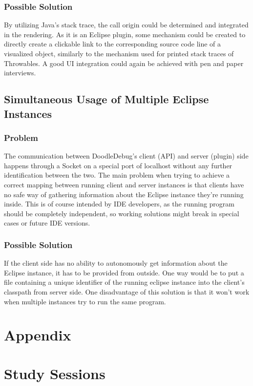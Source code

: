 \documentclass[english]{acm_proc_article-sp}
\begin{document}
\subsubsection{Possible Solution}
By utilizing Java's stack trace, the call origin could be determined and integrated in the rendering. As it is an Eclipse plugin, some mechanism could be created to directly create a clickable link to the corresponding source code line of a visualized object, similarly to the mechanism used for printed stack traces of Throwables. A good UI integration could again be achieved with pen and paper interviews.

\subsection{Simultaneous Usage of Multiple Eclipse Instances}
\subsubsection{Problem}
The communication between DoodleDebug's client (API) and server (plugin) side happens through a Socket on a special port of localhost without any further identification between the two. The main problem when trying to achieve a correct mapping between running client and server instances is that clients have no safe way of gathering information about the Eclipse instance they're running inside. This is of course intended by IDE developers, as the running program should be completely independent, so working solutions might break in special cases or future IDE versions.
\subsubsection{Possible Solution}
If the client side has no ability to autonomously get information about the Eclipse instance, it has to be provided from outside. One way would be to put a file containing a unique identifier of the running eclipse instance into the client's classpath from server side. One disadvantage of this solution is that it won't work when multiple instances try to run the same program.


\section{Appendix}

\section{Study Sessions}
\end{document}
